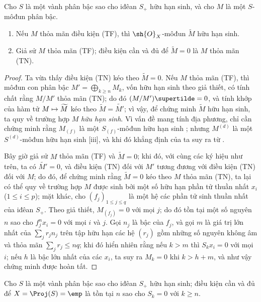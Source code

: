 \documentclass[oneside,10pt]{amsart}
\makeatletter
\renewcommand{\leq}{\leqslant}
\renewcommand{\geq}{\geqslant}
\newcommand{\ega@arrow}[2]{\mathchoice{#1}{#2}{#2}{#2}}
\let\ega@shortmapsto\mapsto
\renewcommand{\mapsto}{\ega@arrow{\longmapsto}{\ega@shortmapsto}}
\newcommand{\oldpage}[2][]{\marginnote{\normalfont\footnotesize\textbf{#1}~|~#2}\ignorespaces}
\let\EGAOriginalLabel\label
\renewcommand{\label}[1]{\phantomsection\EGAOriginalLabel{#1}}
\makeatother
\begin{document}
\begin{proposition}[2.7.3]
\label{II.2.7.3}
Cho $S$ là một vành phân bậc sao cho iđêan $S_+$ hữu hạn sinh, và cho $M$ là một $S$-môđun phân bậc.
\begin{enumerate}
  \item[{\rm(i)}] Nếu $M$ thỏa mãn điều kiện (TF), thì $\sh{O}_X$-môđun $\widetilde{M}$ hữu hạn sinh.
  \item[{\rm(ii)}] Giả sử $M$ thỏa mãn (TF); điều kiện cần và đủ để $\widetilde{M}=0$ là $M$ thỏa mãn (TN).
\end{enumerate}
\end{proposition}

\begin{proof}
Ta vừa thấy điều kiện (TN) kéo theo $\widetilde{M}=0$.
Nếu $M$ thỏa mãn (TF), thì môđun con phân bậc $M'=\bigoplus_{k\geq n}M_k$, vốn hữu hạn sinh theo giả thiết, có tính chất rằng $M/M'$ thỏa mãn (TN); do đó $(M/M')\supertilde=0$, và tính khớp của hàm tử $M\mapsto\widetilde{M}$  kéo theo $\widetilde{M}=\widetilde{M'}$; vì vậy, để chứng minh $\widetilde{M}$ hữu hạn sinh, ta quy về trường hợp $M$ \emph{hữu hạn sinh}.
Vì vấn đề mang tính địa phương, chỉ cần chứng minh rằng $M_{(f)}$ là một $S_{(f)}$-môđun hữu hạn sinh ; nhưng $M^{(d)}$ là một $S^{(d)}$-môđun hữu hạn sinh [iii], và khi đó khẳng định của ta suy ra từ .

Bây giờ giả sử $M$ thỏa mãn (TF) và $\widetilde{M}=0$; khi đó, với cùng các ký hiệu như trên, ta có $\widetilde{M'}=0$, và điều kiện (TN) đối với $M'$ tương đương với điều kiện (TN) đối với $M$; do đó, để chứng minh rằng $\widetilde{M}=0$ kéo theo $M$ thỏa mãn (TN), ta lại có thể quy về trường hợp $M$ được sinh bởi một số hữu hạn phần tử thuần nhất $x_i$ ($1\leq i\leq p$); mặt khác, cho $(f_j)_{1\leq j\leq q}$ là một hệ các phần tử sinh thuần nhất của iđêan $S_+$.
Theo giả thiết, $M_{(f_j)}=0$ với mọi $j$; do đó tồn tại một số nguyên $n$ sao cho $f_j^nx_i=0$ với mọi $i$ và $j$.
Gọi $n_j$ là bậc của $f_j$, và gọi $m$ là giá trị lớn nhất của $\sum_j r_jn_j$ trên tập hữu hạn các hệ $(r_j)$ gồm những số nguyên không âm và thỏa mãn $\sum_j r_j\leq nq$; khi đó hiển nhiên
\oldpage[II]{40}
rằng nếu $k>m$ thì $S_kx_i=0$ với mọi $i$;
nếu $h$ là bậc lớn nhất của các $x_i$, ta suy ra $M_k=0$ khi $k>h+m$, và như vậy chứng minh được hoàn tất.
\end{proof}

\begin{corollary}[2.7.4]
\label{II.2.7.4}
Cho $S$ là một vành phân bậc sao cho iđêan $S_+$ hữu hạn sinh;
điều kiện cần và đủ để $X=\Proj(S)=\emp$ là tồn tại $n$ sao cho $S_k=0$ với $k\geq n$.
\end{corollary}
\end{document}
